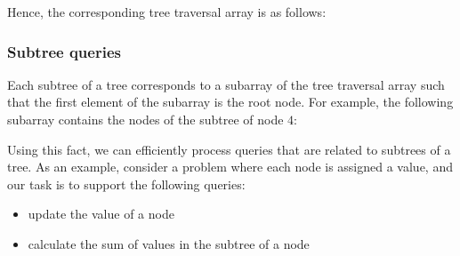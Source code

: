 Hence, the corresponding tree traversal array is as follows:
\begin{center}
\end{center}

\subsubsection{Subtree queries}

Each subtree of a tree corresponds to a subarray
of the tree traversal array such that
the first element of the subarray is the root node.
For example, the following subarray contains the
nodes of the subtree of node $4$:
\begin{center}
\end{center}
Using this fact, we can efficiently process queries
that are related to subtrees of a tree.
As an example, consider a problem where each node
is assigned a value, and our task is to support
the following queries:
\begin{itemize}
\item update the value of a node
\item calculate the sum of values in the subtree of a node
\end{itemize}

